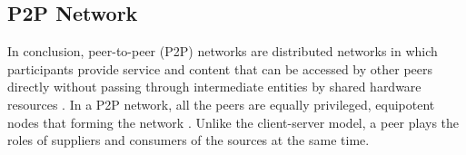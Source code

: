 \subsection{P2P Network}

In conclusion, peer-to-peer (P2P) networks are distributed networks in which participants provide service and content that can be accessed by other peers directly without passing through intermediate entities by shared hardware resources \cite{990434}. In a P2P network, all the peers are equally privileged, equipotent nodes that forming the network \cite{nemat2011taking}. Unlike the client-server model, a peer plays the roles of suppliers and consumers of the sources at the same time.
